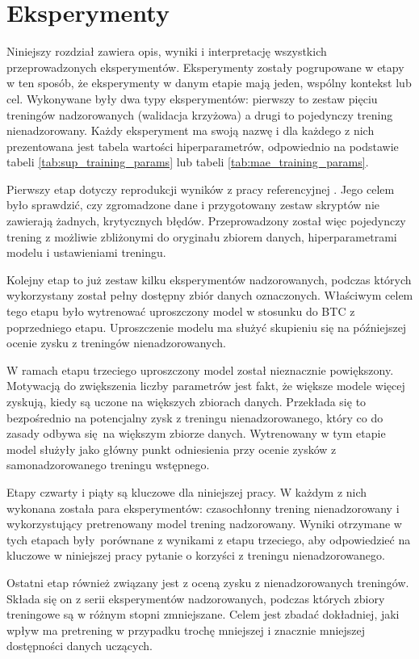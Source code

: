 \chapter{Eksperymenty}

Niniejszy rozdział zawiera opis, wyniki i interpretację wszystkich przeprowadzonych eksperymentów. Eksperymenty zostały pogrupowane w etapy w ten sposób, że eksperymenty w danym etapie mają jeden, wspólny kontekst lub cel. Wykonywane były dwa typy eksperymentów: pierwszy to zestaw pięciu treningów nadzorowanych (walidacja krzyżowa) a drugi to pojedynczy trening nienadzorowany. Każdy eksperyment ma swoją nazwę i dla każdego z nich prezentowana jest tabela wartości hiperparametrów, odpowiednio na podstawie tabeli \ref{tab:sup_training_params} lub tabeli \ref{tab:mae_training_params}.

Pierwszy etap dotyczy reprodukcji wyników z pracy referencyjnej \cite{park_bi-directional_2019}. Jego celem było sprawdzić, czy zgromadzone dane i przygotowany zestaw skryptów nie zawierają żadnych, krytycznych błędów. Przeprowadzony został więc pojedynczy trening z możliwie zbliżonymi do oryginału zbiorem danych, hiperparametrami modelu i ustawieniami treningu.

Kolejny etap to już zestaw kilku eksperymentów nadzorowanych, podczas których wykorzystany został pełny dostępny zbiór danych oznaczonych. Właściwym celem tego etapu było wytrenować uproszczony model w stosunku do BTC z poprzedniego etapu. Uproszczenie modelu ma służyć skupieniu się na późniejszej ocenie zysku z treningów nienadzorowanych.

W ramach etapu trzeciego uproszczony model został nieznacznie powiększony. Motywacją do zwiększenia liczby parametrów jest fakt, że większe modele więcej zyskują, kiedy są uczone na większych zbiorach danych. Przekłada się to bezpośrednio na potencjalny zysk z treningu nienadzorowanego, który co do zasady odbywa się na większym zbiorze danych. Wytrenowany w tym etapie model służyły jako główny punkt odniesienia przy ocenie zysków z samonadzorowanego treningu wstępnego.

Etapy czwarty i piąty są kluczowe dla niniejszej pracy. W każdym z nich wykonana została para eksperymentów: czasochłonny trening nienadzorowany i wykorzystujący pretrenowany model trening nadzorowany. Wyniki otrzymane w tych etapach były porównane z wynikami z etapu trzeciego, aby odpowiedzieć na kluczowe w niniejszej pracy pytanie o korzyści z treningu nienadzorowanego.

Ostatni etap również związany jest z oceną zysku z nienadzorowanych treningów. Składa się on z serii eksperymentów nadzorowanych, podczas których zbiory treningowe są w różnym stopni zmniejszane. Celem jest zbadać dokładniej, jaki wpływ ma pretrening w przypadku trochę mniejszej i znacznie mniejszej dostępności danych uczących.



